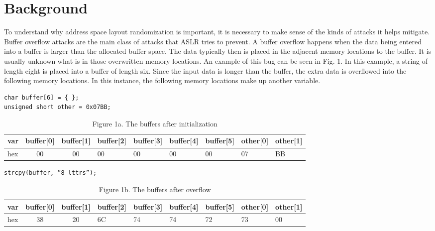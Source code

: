 \section{Background}
\label{s:background} %

To understand why address space layout randomization is important, it is necessary to make sense of the kinds of attacks it helps mitigate. Buffer overflow attacks are the main class of attacks that ASLR tries to prevent. A buffer overflow happens when the data being entered into a buffer is larger than the allocated buffer space. The data typically then is placed in the adjacent memory locations to the buffer. It is usually unknown what is in those overwritten memory locations. An example of this bug can be seen in Fig. 1. In this example, a string of length eight is placed into a buffer of length six. Since the input data is longer than the buffer, the extra data is overflowed into the following memory locations. In this instance, the following memory locations make up another variable.

\begin{lstlisting}
char buffer[6] = { };
unsigned short other = 0x07BB;
\end{lstlisting}

\begin{table}
\centering %
\begin{tabular}{l|cc} %
var & buffer[0] & buffer[1] & buffer[2] & buffer[3] & buffer[4] & buffer[5] & other[0] & other[1] \\ %
\hline %
hex & 00 & 00 & 00 & 00 & 00 & 00 & 07 & BB \\
\end{tabular}
\caption{Figure 1a. The buffers after initialization}
\label{t:fig1a}
\end{table}

\begin{lstlisting}
strcpy(buffer, “8 lttrs”);
\end{lstlisting}

\begin{table}
\centering %
\begin{tabular}{l|cc} %
var & buffer[0] & buffer[1] & buffer[2] & buffer[3] & buffer[4] & buffer[5] & other[0] & other[1] \\ %
\hline %
hex & 38 & 20 & 6C & 74 & 74 & 72 & 73 & 00 \\
\end{tabular}
\caption{Figure 1b. The buffers after overflow}
\label{t:fig1b}
\end{table}

